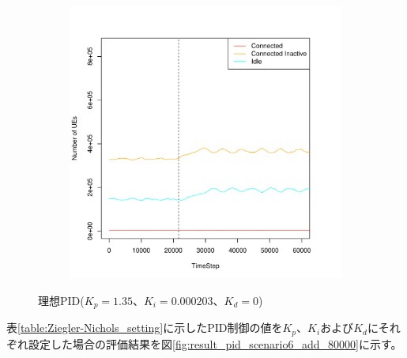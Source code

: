 \documentclass[a4j]{ujarticle}
\begin{document}
\begin{figure}[htbp]
\begin{subfigure}{0.49\hsize}
   \label{subfig:scenario_6_signaling_and_memoryload_vs_timeStep_345600_691200_1-35_0-000203_0_0_ideal_add_80000}
 \end{subfigure}
 \begin{subfigure}{0.49\hsize}
   \centering
   \includegraphics[width=1.0\hsize]{scenario_6_stateBreakdown_345600_691200_1-35_0-000203_0_0_ideal_add_80000.pdf}
   \label{subfig:scenario_6_stateBreakdown_345600_691200_1-35_0-000203_0_0_ideal_add_80000}
 \end{subfigure}
 \caption{理想PID($K_p = 1.35、K_i = 0.000203、K_d = 0$)}
 \label{fig:result_pi_scenario6_add_80000}
\end{figure}
\clearpage
表\ref{table:Ziegler-Nichols_setting}に示したPID制御の値を$K_p$、$K_i$および$K_d$にそれぞれ設定した場合の評価結果を図\ref{fig:result_pid_scenario6_add_80000}に示す。
\end{document}
